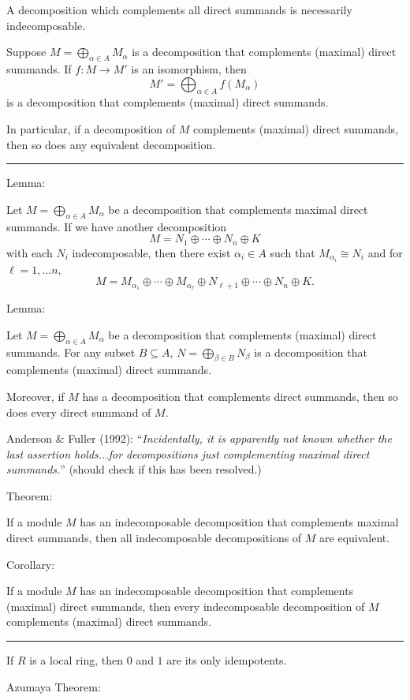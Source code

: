\documentclass[12pt]{article}
\newcommand{\sepline}{\rule{\textwidth}{0.4pt}}
\theoremstyle{definition}
\newcommand{\<}{\left\langle}
\renewcommand{\>}{\right\rangle}
\newcommand{\iso}{\cong}
\newcommand{\seq}{\subseteq}
\renewcommand{\_}[1]{{_{#1}}}
\begin{document}
A decomposition which complements all direct summands is necessarily indecomposable.

Suppose $M = \bigoplus_{\alpha \in A} M_\alpha$ is a decomposition that complements (maximal) direct summands.
If $f : M \to M'$ is an isomorphism, then
\[
    M' = \bigoplus_{\alpha \in A} f(M_\alpha)
\]
is a decomposition that complements (maximal) direct summands.

In particular, if a decomposition of $M$ complements (maximal) direct summands, then so does any equivalent decomposition.

\sepline

Lemma:

Let $M = \bigoplus_{\alpha \in A} M_\alpha$ be a decomposition that complements maximal direct summands.
If we have another decomposition
\[
    M = N_1 \oplus \cdots \oplus N_n \oplus K
\]
with each $N_i$ indecomposable, then there exist $\alpha_i \in A$ such that $M_{\alpha_i} \iso N_i$ and for $\ell = 1, \dots n$,
\[
    M = M_{\alpha_1} \oplus \cdots \oplus M_{\alpha_\ell} \oplus N_{\ell + 1} \oplus \cdots \oplus N_n \oplus K.
\]

Lemma:

Let $M = \bigoplus_{\alpha \in A} M_\alpha$ be a decomposition that complements (maximal) direct summands.
For any subset $B \seq A$, $N = \bigoplus_{\beta \in B} N_\beta$ is a decomposition that complements (maximal) direct summands.

Moreover, if $M$ has a decomposition that complements direct summands, then so does every direct summand of $M$.

Anderson \& Fuller (1992): ``\textit{Incidentally, it is apparently not known whether the last assertion holds...for decompositions just complementing maximal direct summands.}''
(should check if this has been resolved.)

Theorem:

If a module $M$ has an indecomposable decomposition that complements maximal direct summands, then all indecomposable decompositions of $M$ are equivalent.

Corollary:

If a module $M$ has an indecomposable decomposition that complements (maximal) direct summands, then every indecomposable decomposition of $M$ complements (maximal) direct summands.

\sepline

If $R$ is a local ring, then $0$ and $1$ are its only idempotents.

Azumaya Theorem:
\end{document}
